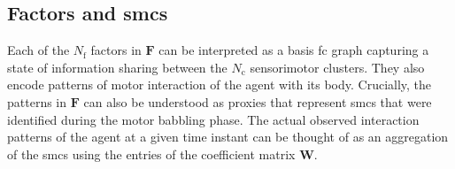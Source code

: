 
\subsection{Factors and \acp{smc}}
Each of the $N_\text{f}$ factors in $\bm{F}$ can be interpreted as a basis \ac{fc} graph capturing a state of information sharing between the $N_\text{c}$ sensorimotor clusters. They also encode patterns of motor interaction of the agent with its body. Crucially, the patterns in $\bm{F}$ can also be understood as proxies that represent \acp{smc} that were identified during the motor babbling phase. The actual observed interaction patterns of the agent at a given time instant can be thought of as an aggregation of the \acp{smc} using the entries of the coefficient matrix $\bm{W}$.

%





